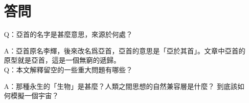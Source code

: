 \chapter{答問}



Q：亞首的名字是甚麼意思，來源於何處？

A：亞首原名李輝，後來改名爲亞首，亞首的意思是「亞於其首」。文章中亞首的原型就是亞首，這是一個無窮的遞歸。
\\

Q：本文解釋留空的一些重大問題有哪些？

A：那種永生的「生物」是甚麼？人類之間思想的自然兼容層是什麼？ 到底該如何模擬一個宇宙？%

